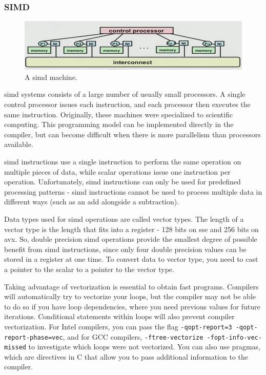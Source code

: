 \documentclass[10pt]{article}
\begin{document}
\begin{flushleft}
\subsubsection{SIMD}

\begin{figure}[H]
\centering
\includegraphics[width=0.75\linewidth]{figures/simd.pdf}
\caption{A \gls{simd} machine.}
\end{figure}

\gls{simd} systems consists of a large number of usually small processors. A single control processor issues each instruction, and each processor then executes the same instruction. Originally, these machines were specialized to scientific computing. This programming model can be implemented directly in the compiler, but can become difficult when there is more parallelism than processors available. 

\gls{simd} instructions use a single instruction to perform the same operation on multiple pieces of data, while scalar operations issue one instruction per operation. Unfortunately, \gls{simd} instructions can only be used for predefined processing patterns - \gls{simd} instructions cannot be used to process multiple data in different ways (such as an add alongside a subtraction). 

Data types used for \gls{simd} operations are called vector types. The length of a vector type is the length that fits into a register - 128 bits on \gls{sse} and 256 bits on \gls{avx}. So, double precision \gls{simd} operations provide the smallest degree of possible benefit from \gls{simd} instructions, since only four double precision values can be stored in a register at one time. To convert data to vector type, you need to cast a pointer to the scalar to a pointer to the vector type. 

Taking advantage of vectorization is essential to obtain fast programs. Compilers will automatically try to vectorize your loops, but the compiler may not be able to do so if you have loop dependencies, where you need previous values for future iterations. Conditional statements within loops will also prevent compiler vectorization. For Intel compilers, you can pass the flag {\tt -qopt-report=3 -qopt-report-phase=vec}, and for GCC compilers, {\tt -ftree-vectorize -fopt-info-vec-missed} to investigate which loops were not vectorized. You can also use pragmas, which are directives in C that allow you to pass additional information to the compiler.


\end{flushleft}
\end{document}

